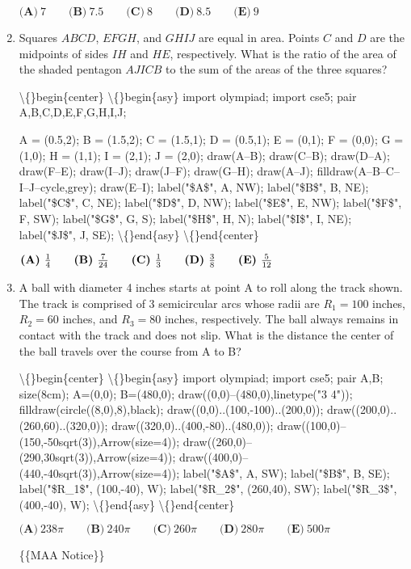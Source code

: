 \documentclass{article}
\begin{document}
\begin{enumerate}[label=\arabic*., itemsep=0.5em]
\(\textbf{(A)}\ 7 \qquad \textbf{(B)}\ 7.5 \qquad \textbf{(C)}\ 8 \qquad \textbf{(D)}\ 8.5 \qquad \textbf{(E)}\ 9\)\par \vspace{0.5em}\item Squares \(ABCD\), \(EFGH\), and \(GHIJ\) are equal in area. Points \(C\) and \(D\) are the midpoints of sides \(IH\) and \(HE\), respectively. What is the ratio of the area of the shaded pentagon \(AJICB\) to the sum of the areas of the three squares?


\textbackslash\{\}begin\{center\}
\textbackslash\{\}begin\{asy\}
import olympiad;
import cse5;
pair A,B,C,D,E,F,G,H,I,J;

A = (0.5,2);
B = (1.5,2);
C = (1.5,1);
D = (0.5,1);
E = (0,1);
F = (0,0);
G = (1,0);
H = (1,1);
I = (2,1);
J = (2,0); 
draw(A--B); 
draw(C--B); 
draw(D--A);  
draw(F--E); 
draw(I--J); 
draw(J--F); 
draw(G--H); 
draw(A--J); 
filldraw(A--B--C--I--J--cycle,grey);
draw(E--I);
label("\$A\$", A, NW);
label("\$B\$", B, NE);
label("\$C\$", C, NE);
label("\$D\$", D, NW);
label("\$E\$", E, NW);
label("\$F\$", F, SW);
label("\$G\$", G, S);
label("\$H\$", H, N);
label("\$I\$", I, NE);
label("\$J\$", J, SE);
\textbackslash\{\}end\{asy\}
\textbackslash\{\}end\{center\}



\( \textbf{(A)}\hspace{.05in}\frac{1}{4}\qquad\textbf{(B)}\hspace{.05in}\frac{7}{24}\qquad\textbf{(C)}\hspace{.05in}\frac{1}{3}\qquad\textbf{(D)}\hspace{.05in}\frac{3}{8}\qquad\textbf{(E)}\hspace{.05in}\frac{5}{12}\)\par \vspace{0.5em}\item A ball with diameter 4 inches starts at point A to roll along the track shown. The track is comprised of 3 semicircular arcs whose radii are \(R_1 = 100\) inches, \(R_2 = 60\) inches, and \(R_3 = 80\) inches, respectively. The ball always remains in contact with the track and does not slip. What is the distance the center of the ball travels over the course from A to B?


\textbackslash\{\}begin\{center\}
\textbackslash\{\}begin\{asy\}
import olympiad;
import cse5;
pair A,B;
size(8cm);
A=(0,0);
B=(480,0);
draw((0,0)--(480,0),linetype("3 4"));
filldraw(circle((8,0),8),black);
draw((0,0)..(100,-100)..(200,0));
draw((200,0)..(260,60)..(320,0));
draw((320,0)..(400,-80)..(480,0));
draw((100,0)--(150,-50sqrt(3)),Arrow(size=4));
draw((260,0)--(290,30sqrt(3)),Arrow(size=4));
draw((400,0)--(440,-40sqrt(3)),Arrow(size=4));
label("\$A\$", A, SW);
label("\$B\$", B, SE);
label("\$R\_1\$", (100,-40), W);
label("\$R\_2\$", (260,40), SW);
label("\$R\_3\$", (400,-40), W);
\textbackslash\{\}end\{asy\}
\textbackslash\{\}end\{center\}


\( \textbf{(A)}\ 238\pi\qquad\textbf{(B)}\ 240\pi\qquad\textbf{(C)}\ 260\pi\qquad\textbf{(D)}\ 280\pi\qquad\textbf{(E)}\ 500\pi \)



\{\{MAA Notice\}\}\par \vspace{0.5em}\end{enumerate}
\end{document}
